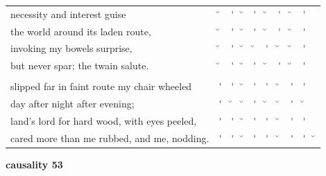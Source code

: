 \documentclass[12pt, landscape]{article}
\begin{document}
\begin{center}
\begin{tabularx}{\textwidth}{
>{\lefting\arraybackslash}X
c
c
c
c
c
c
c
c
c
}

necessity and interest guise & \u{} & \'{} & \u{} & \'{} & \u{} & \'{} & \u{} & \'{} & \\
the world around its laden route, & \u{} & \'{} & \u{} & \'{} & \u{} & \'{} & \u{} & \'{} & \\
invoking my bowels surprise, & \u{} & \'{} & \u{} & \u{} & \'{} & \u{} & \u{} & \'{} \\
but never spar; the twain salute. & \u{} & \'{} & \u{} & \'{} & \u{} & \'{} & \u{} & \'{} & \\
 & & & & & & & & \\
slipped far in faint route my chair wheeled & \'{} & \'{} & \u{} & \'{} & \'{} & \u{} & \'{} & \'{} & \\
day after night after evening; & \'{} & \u{} & \u{} & \'{} & \u{} & \u{} & \'{} & \u{} \\
land's lord for hard wood, with eyes peeled, & \'{} & \'{} & \u{} & \'{} & \'{} & \u{} & \'{} & \'{} & \\
cared more than me rubbed, and me, nodding. & \'{} & \'{} & \u{} & \'{} & \'{} & \u{} & \'{} & \'{} & \u{} \\

\end{tabularx}
\end{center}

\vspace*{\fill}

\newpage

\vspace*{\fill}

\noindent \textbf{causality 53}
\noindent \hfill \par
\end{document}
